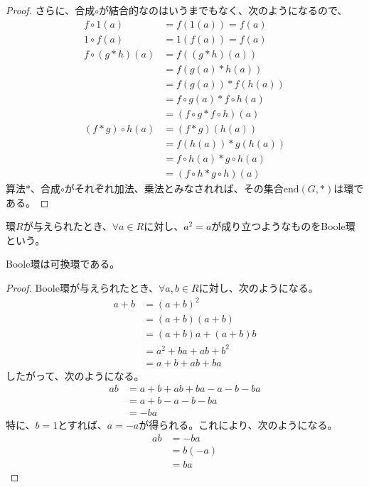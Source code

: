 \documentclass[dvipdfmx]{jsarticle}
\begin{document}
\begin{proof}
さらに、合成$\circ$が結合的なのはいうまでもなく、次のようになるので、
\begin{align*}
f \circ 1(a) &= f\left( 1(a) \right) = f(a)\\
1 \circ f(a) &= 1\left( f(a) \right) = f(a)\\
f \circ (g*h)(a) &= f\left( (g*h)(a) \right)\\
&= f\left( g(a)*h(a) \right)\\
&= f\left( g(a) \right)*f\left( h(a) \right)\\
&= f \circ g(a)*f \circ h(a)\\
&= (f \circ g*f \circ h)(a)\\
(f*g) \circ h(a) &= (f*g)\left( h(a) \right)\\
&= f\left( h(a) \right)*g\left( h(a) \right)\\
&= f \circ h(a)*g \circ h(a)\\
&= (f \circ h*g \circ h)(a)
\end{align*}
算法$*$、合成$\circ$がそれぞれ加法、乗法とみなされれば、その集合$\mathrm{end}(G,*)$は環である。
\end{proof}
\begin{dfn}
環$R$が与えられたとき、$\forall a \in R$に対し、$a^{2} = a$が成り立つようなものをBoole環という。
\end{dfn}
\begin{thm}\label{3.3.1.6}
Boole環は可換環である。
\end{thm}
\begin{proof}
Boole環が与えられたとき、$\forall a,b \in R$に対し、次のようになる。
\begin{align*}
a + b &= (a + b)^{2}\\
&= (a + b)(a + b)\\
&= (a + b)a + (a + b)b\\
&= a^{2} + ba + ab + b^{2}\\
&= a + b + ab + ba
\end{align*}
したがって、次のようになる。
\begin{align*}
ab &= a + b + ab + ba - a - b - ba\\
&= a + b - a - b - ba\\
&= - ba
\end{align*}
特に、$b = 1$とすれば、$a = - a$が得られる。これにより、次のようになる。
\begin{align*}
ab &= - ba\\
&= b( - a)\\
&= ba
\end{align*}
\end{proof}
\end{document}
